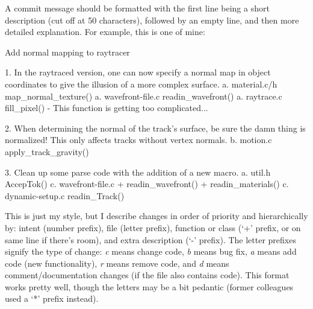 A commit message should be formatted with the first line being a short description (cut off at 50 characters), followed by an empty line, and then more detailed explanation.
For example, this is one of mine:
\begin{code}
Add normal mapping to raytracer

1. In the raytraced version, one can now specify a normal map in
   object coordinates to give the illusion of a more complex surface.
  a. material.c/h  map_normal_texture()
  a. wavefront-file.c  readin_wavefront()
  a. raytrace.c  fill_pixel()
     - This function is getting too complicated...

2. When determining the normal of the track's surface, be sure the damn
   thing is normalized! This only affects tracks without vertex normals.
  b. motion.c  apply_track_gravity()

3. Clean up some parse code with the addition of a new macro.
  a. util.h  AccepTok()
  c. wavefront-file.c
    + readin_wavefront()
    + readin_materials()
  c. dynamic-setup.c  readin_Track()
\end{code}
This is just my style, but I describe changes in order of priority and hierarchically by: intent (number prefix), file (letter prefix), function or class (`+' prefix, or on same line if there's room), and extra description (`-' prefix).
The letter prefixes signify the type of change: \textit{c} means change code, \textit{b} means bug fix, \textit{a} means add code (new functionality), \textit{r} means remove code, and \textit{d} means comment/documentation changes (if the file also contains code).
This format works pretty well, though the letters may be a bit pedantic (former colleagues used a `*' prefix instead).




